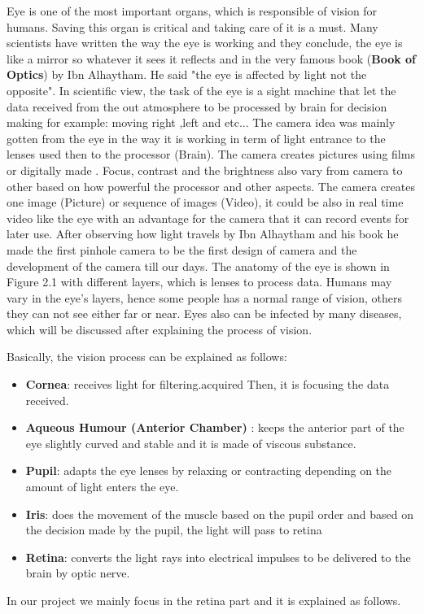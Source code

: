 Eye is one of the most important organs, which is responsible of vision for humans.
Saving this organ is critical and taking care of it is a must.
Many scientists have written the way the eye is working and they conclude, the eye is like a mirror so whatever it sees it reflects and in the very famous book (\textbf{Book of Optics}) by Ibn Alhaytham.
He said "the eye is affected by light not the opposite".
In scientific view, the task of the eye is a sight machine that let the data received from the out atmosphere to be processed by brain for decision making for example: moving right ,left and etc... 
The camera idea was mainly gotten from the eye in the way it is working in term of light entrance to the lenses used then to the processor (Brain).
The camera creates pictures using films or digitally made \cite{abramoff2010retinalthe}.
Focus, contrast and the brightness also vary from camera to other based on how powerful the processor and other aspects.
The camera creates one image (Picture) or sequence of images (Video), it could be also in real time video like the eye with an advantage for the camera that it can record events for later use.
After observing how light travels by Ibn Alhaytham and his book he made the first pinhole camera to be the first design of camera and the development of the camera till our days.  
The anatomy of the eye is shown in Figure 2.1 with different layers, which is lenses to process data.
Humans may vary in the eye's layers, hence some people has a normal range of vision, others they can not see either far or near.
Eyes also can be infected by many diseases, which will be discussed after explaining the process of vision. 

Basically, the vision process can be explained as follows:
\begin{itemize}
\item \textbf{Cornea}: receives light for filtering.acquired
Then, it is focusing the data received.
\item \textbf{Aqueous Humour (Anterior Chamber)} : keeps the anterior part of the eye slightly curved and stable and it is made of viscous substance.
\item \textbf{Pupil}: adapts the eye lenses by relaxing or contracting depending on the amount of light enters the eye.
\item \textbf{Iris}: does the movement of the muscle based on the pupil order and based on the decision made by the pupil, the light will pass to retina
\item \textbf{Retina}: converts the light rays into electrical impulses to be delivered to the brain by optic nerve.

\end{itemize}
In our project we mainly focus in the retina part and it is explained as follows.

